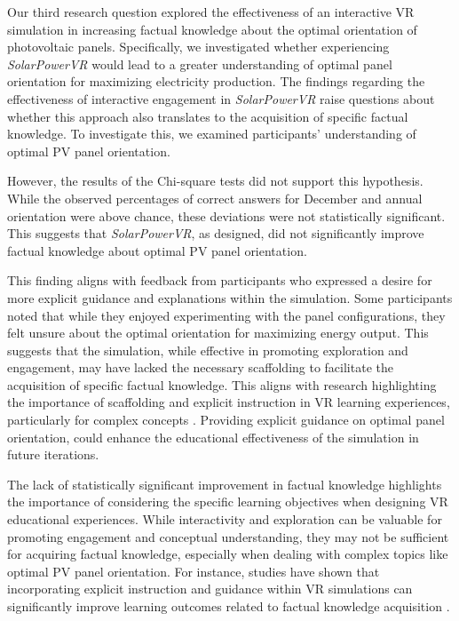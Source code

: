 \documentclass[draft, final]{vutinfth} %
\begin{document}
Our third research question explored the effectiveness of an interactive VR simulation in increasing factual knowledge about the optimal orientation of photovoltaic panels. Specifically, we investigated whether experiencing \textit{SolarPowerVR} would lead to a greater understanding of optimal panel orientation for maximizing electricity production. The findings regarding the effectiveness of interactive engagement in \textit{SolarPowerVR} raise questions about whether this approach also translates to the acquisition of specific factual knowledge. To investigate this, we examined participants' understanding of optimal PV panel orientation.

However, the results of the Chi-square tests did not support this hypothesis. While the observed percentages of correct answers for December and annual orientation were above chance, these deviations were not statistically significant. This suggests that \textit{SolarPowerVR}, as designed, did not significantly improve factual knowledge about optimal PV panel orientation.

This finding aligns with feedback from participants who expressed a desire for more explicit guidance and explanations within the simulation. Some participants noted that while they enjoyed experimenting with the panel configurations, they felt unsure about the optimal orientation for maximizing energy output. This suggests that the simulation, while effective in promoting exploration and engagement, may have lacked the necessary scaffolding to facilitate the acquisition of specific factual knowledge. This aligns with research highlighting the importance of scaffolding and explicit instruction in VR learning experiences, particularly for complex concepts \cite{Dalgarno2010Learning, Mikropoulos2011VrEducational}. Providing explicit guidance on optimal panel orientation, could enhance the educational effectiveness of the simulation in future iterations.

The lack of statistically significant improvement in factual knowledge highlights the importance of considering the specific learning objectives when designing VR educational experiences. While interactivity and exploration can be valuable for promoting engagement and conceptual understanding, they may not be sufficient for acquiring factual knowledge, especially when dealing with complex topics like optimal PV panel orientation. For instance, studies have shown that incorporating explicit instruction and guidance within VR simulations can significantly improve learning outcomes related to factual knowledge acquisition \cite{Merchant2014VrEffectiveness}.
\end{document}
